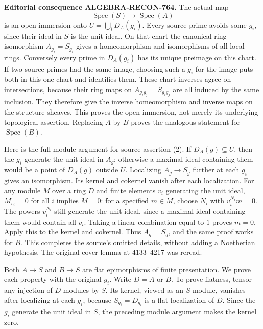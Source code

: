 \textbf{Editorial consequence ALGEBRA-\AlgebraIdentifierBreak{}RECON-\AlgebraIdentifierBreak{}764.} The actual map \[
 \operatorname{Spec}(S)\longrightarrow\operatorname{Spec}(A)
\] is an open immersion onto \(U=\bigcup_iD_A(g_i)\). Every source prime avoids some \(g_i\), since their ideal in \(S\) is the unit ideal. On that chart the canonical ring isomorphism \(A_{g_i}=S_{g_i}\) gives a homeomorphism and isomorphisms of all local rings. Conversely every prime in \(D_A(g_i)\) has its unique preimage on this chart. If two source primes had the same image, choosing such a \(g_i\) for the image puts both in this one chart and identifies them. These chart inverses agree on intersections, because their ring maps on \(A_{g_ig_j}=S_{g_ig_j}\) are all induced by the same inclusion. They therefore give the inverse homeomorphism and inverse maps on the structure sheaves. This proves the open immersion, not merely its underlying topological assertion. Replacing \(A\) by \(B\) proves the analogous statement for \(\operatorname{Spec}(B)\).

Here is the full module argument for source assertion (2). If \(D_A(g)\subseteq U\), then the \(g_i\) generate the unit ideal in \(A_g\); otherwise a maximal ideal containing them would be a point of \(D_A(g)\) outside \(U\). Localizing \(A_g\to S_g\) further at each \(g_i\) gives an isomorphism. Its kernel and cokernel vanish after each localization. For any module \(M\) over a ring \(D\) and finite elements \(v_i\) generating the unit ideal, \(M_{v_i}=0\) for all \(i\) implies \(M=0\): for a specified \(m\in M\), choose \(N_i\) with \(v_i^{N_i}m=0\). The powers \(v_i^{N_i}\) still generate the unit ideal, since a maximal ideal containing them would contain all \(v_i\). Taking a linear combination equal to \(1\) proves \(m=0\). Apply this to the kernel and cokernel. Thus \(A_g=S_g\), and the same proof works for \(B\). This completes the source's omitted details, without adding a Noetherian hypothesis. The original cover lemma at 4133--4217 was reread.

Both \(A\to S\) and \(B\to S\) are flat epimorphisms of finite presentation. We prove each property with the original \(g_i\). Write \(D=A\) or \(B\). To prove flatness, tensor any injection of \(D\)-modules by \(S\). Its kernel, viewed as an \(S\)-module, vanishes after localizing at each \(g_i\), because \(S_{g_i}=D_{g_i}\) is a flat localization of \(D\). Since the \(g_i\) generate the unit ideal in \(S\), the preceding module argument makes the kernel zero.

